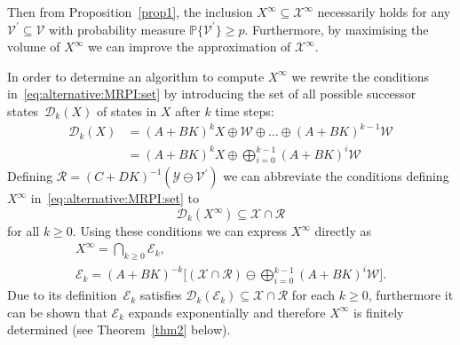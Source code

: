 \documentclass{ifacconf}
\providecommand{\Xinfty}{{\mathscr X}^\infty}
\providecommand{\E}{\mathcal E}
\providecommand{\W}{\mathcal W}
\providecommand{\V}{\mathcal V}
\providecommand{\X}{\mathcal X}
\providecommand{\Y}{\mathcal Y}
\providecommand{\R}{\mathcal R}
\providecommand{\D}{\mathscr D}
\providecommand{\PP}{\mathbb P}
\begin{document}
%
Then from Proposition~\ref{prop1}, the inclusion $X^\infty\subseteq\Xinfty$ necessarily holds for any $\V^\prime\subseteq\V$ with probability measure $\PP\{\V^\prime\} \geq p$. Furthermore, by maximising the volume of $X^\infty$ we can improve the approximation of $\Xinfty$.


In order to determine an algorithm to compute $X^\infty$ we rewrite the conditions in~\eqref{eq:alternative:MRPI:set} by introducing the set of all possible successor states~$\D_k(X)$ of states in $X$ after $k$ time steps:
%
\begin{align*}
	\D_k(X) &= (A+BK)^{k}X\oplus\W\oplus\dots\oplus(A+BK)^{k-1}\W\\
	&= (A+BK)^k X\oplus \bigoplus_{i=0}^{k-1}(A+BK)^i\W
\end{align*}
%
Defining $\R = (C+DK)^{-1}(\Y\ominus\V^\prime)$ we can abbreviate the conditions defining $X^\infty$ in~\eqref{eq:alternative:MRPI:set} to
%
\begin{equation}\label{eq:containment:condition:alternative:MRPI}
\D_k(X^\infty)\subseteq\X\cap\R
\end{equation}
%
for all $k\geq0$.
%
Using these conditions we can express $X^\infty$ directly as
%
\begin{gather}
X^\infty = %
\bigcap_{k\geq0} \E_k, \\
\E_k = (A+BK)^{-k}\biggl[(\X\cap\R)\ominus\bigoplus_{i=0}^{k-1}(A+BK)^i\W\biggr] . \label{eq:Ek:subtract}
\end{gather}
%
Due to its definition~$\E_k$ satisfies $\D_k(\E_k)\subseteq\X\cap\R$ for each $k\geq0$, furthermore it can be shown that $\E_k$ expands exponentially and therefore $X^\infty$ is finitely determined  (see Theorem~\ref{thm2} below).
\end{document}
